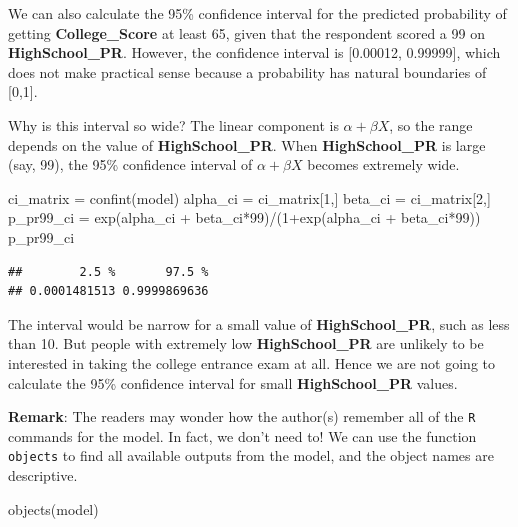 \documentclass[
]{article}
\newenvironment{Shaded}{\begin{snugshade}}{\end{snugshade}}
\newcommand{\DecValTok}[1]{\textcolor[rgb]{0.00,0.00,0.81}{#1}}
\newcommand{\FunctionTok}[1]{\textcolor[rgb]{0.00,0.00,0.00}{#1}}
\newcommand{\NormalTok}[1]{#1}
\newcommand{\OtherTok}[1]{\textcolor[rgb]{0.56,0.35,0.01}{#1}}
\newcommand{\SpecialCharTok}[1]{\textcolor[rgb]{0.00,0.00,0.00}{#1}}
\begin{document}
We can also calculate the 95\% confidence interval for the predicted
probability of getting \textbf{College\_Score} at least 65, given that
the respondent scored a 99 on \textbf{HighSchool\_PR}. However, the
confidence interval is {[}0.00012, 0.99999{]}, which does not make
practical sense because a probability has natural boundaries of
{[}0,1{]}.

Why is this interval so wide? The linear component is
\(\alpha + \beta X\), so the range depends on the value of
\textbf{HighSchool\_PR}. When \textbf{HighSchool\_PR} is large (say,
99), the 95\% confidence interval of \(\alpha + \beta X\) becomes
extremely wide.

\begin{Shaded}
\begin{Highlighting}[]
\NormalTok{ci\_matrix }\OtherTok{=} \FunctionTok{confint}\NormalTok{(model)}
\NormalTok{alpha\_ci }\OtherTok{=}\NormalTok{ ci\_matrix[}\DecValTok{1}\NormalTok{,]}
\NormalTok{beta\_ci }\OtherTok{=}\NormalTok{ ci\_matrix[}\DecValTok{2}\NormalTok{,]}
\NormalTok{p\_pr99\_ci }\OtherTok{=} \FunctionTok{exp}\NormalTok{(alpha\_ci }\SpecialCharTok{+}\NormalTok{ beta\_ci}\SpecialCharTok{*}\DecValTok{99}\NormalTok{)}\SpecialCharTok{/}\NormalTok{(}\DecValTok{1}\SpecialCharTok{+}\FunctionTok{exp}\NormalTok{(alpha\_ci }\SpecialCharTok{+}\NormalTok{ beta\_ci}\SpecialCharTok{*}\DecValTok{99}\NormalTok{))}
\NormalTok{p\_pr99\_ci}
\end{Highlighting}
\end{Shaded}

\begin{verbatim}
##        2.5 %       97.5 % 
## 0.0001481513 0.9999869636
\end{verbatim}

The interval would be narrow for a small value of
\textbf{HighSchool\_PR}, such as less than 10. But people with extremely
low \textbf{HighSchool\_PR} are unlikely to be interested in taking the
college entrance exam at all. Hence we are not going to calculate the
95\% confidence interval for small \textbf{HighSchool\_PR} values.

\textbf{Remark}: The readers may wonder how the author(s) remember all
of the \texttt{R} commands for the model. In fact, we don't need to! We
can use the function \texttt{objects} to find all available outputs from
the model, and the object names are descriptive.

\begin{Shaded}
\begin{Highlighting}[]
\FunctionTok{objects}\NormalTok{(model)}
\end{Highlighting}
\end{Shaded}
\end{document}
